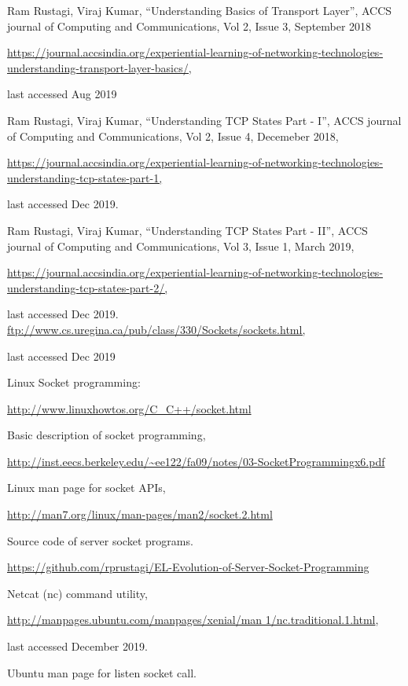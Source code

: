 \begin{multicols}{2}
\begin{thebibliography}{99}
 Ram Rustagi, Viraj Kumar, “Understanding Basics of Transport Layer”, ACCS journal of Computing and Communications, Vol 2, Issue 3, September 2018

\url{https://journal.accsindia.org/experiential-learning-of-networking-technologies-understanding-transport-layer-basics/,}

last accessed Aug 2019

 Ram Rustagi, Viraj Kumar, “Understanding TCP States Part - I”, ACCS journal of Computing and Communications, Vol 2, Issue 4, Decemeber 2018,

\url{https://journal.accsindia.org/experiential-learning-of-networking-technologies-understanding-tcp-states-part-1,}

last accessed Dec 2019.

 Ram Rustagi, Viraj Kumar, “Understanding TCP States Part - II”, ACCS journal of Computing and Communications, Vol 3, Issue 1, March 2019,

\url{https://journal.accsindia.org/experiential-learning-of-networking-technologies-understanding-tcp-states-part-2/,}

last accessed Dec 2019.
 \url{ftp://www.cs.uregina.ca/pub/class/330/Sockets/sockets.html,}

 last accessed Dec 2019

 Linux Socket programming: 

\url{http://www.linuxhowtos.org/C_C++/socket.html}

 Basic description of socket programming,

\url{http://inst.eecs.berkeley.edu/~ee122/fa09/notes/03-SocketProgrammingx6.pdf}

 Linux man page for socket APIs,

 \url{http://man7.org/linux/man-pages/man2/socket.2.html}

 Source code of server socket programs.

\url{https://github.com/rprustagi/EL-Evolution-of-Server-Socket-Programming}

 Netcat (nc) command utility,

\url{http://manpages.ubuntu.com/manpages/xenial/man 1/nc.traditional.1.html},

last accessed December 2019. 

 Ubuntu man page for listen socket call.


\end{thebibliography}
\end{multicols}
